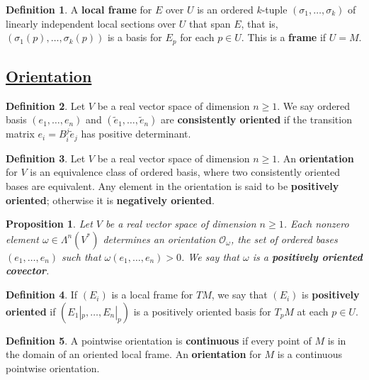 \documentclass[11pt]{amsart}
\newtheorem*{proposition*}{Proposition}
\theoremstyle{definition}
\newtheorem*{definition*}{Definition}
\renewcommand\geq{\geqslant}
\renewcommand\tilde{\widetilde}
\renewcommand\:{\colon}
\newcommand{\calO}{\mathcal{O}}
\newcommand{\1}{\mathds{1}}
\begin{document}
\begin{definition*}
	A \textbf{local frame} for $E$ over $U$ is an ordered $k$-tuple $(\sigma_1, \dots, \sigma_k)$ of linearly independent local sections over $U$ that span $E$, that is, $(\sigma_1(p), \dots, \sigma_k(p))$ is a basis for $E_p$ for each $p \in U$. This is a \textbf{frame} if $U = M$.
\end{definition*}

\vskip20pt



\subsection*{\underline{Orientation}}

\begin{definition*}
	Let $V$ be a real vector space of dimension $n \geq 1$. We say ordered basis $(e_1, \dots, e_n)$ and $(\tilde e_1, \dots, \tilde e_n)$ are \textbf{consistently oriented} if the transition matrix $e_i = B_i^j \tilde e_j$ has positive determinant.
\end{definition*}

\begin{definition*}
	Let $V$ be a real vector space of dimension $n \geq 1$. An \textbf{orientation} for $V$ is an equivalence class of ordered basis, where two consistently oriented bases are equivalent. Any element in the orientation is said to be \textbf{positively oriented}; otherwise it is \textbf{negatively oriented}.
\end{definition*}

\begin{proposition*}
	Let $V$ be a real vector space of dimension $n \geq 1$. Each nonzero element $\omega \in \Lambda^n(V^*)$ determines an orientation $\calO_\omega$, the set of ordered bases $(e_1, \dots, e_n)$ such that $\omega(e_1, \dots, e_n) > 0$. We say that $\omega$ is a \textbf{positively oriented covector}.
\end{proposition*}

\begin{definition*}
	If $(E_i)$ is a local frame for $TM$, we say that $(E_i)$ is \textbf{positively oriented} if $(E_1|_p, \dots, E_n|_p)$ is a positively oriented basis for $T_pM$ at each $p \in U$.
\end{definition*}

\begin{definition*}
	A pointwise orientation is \textbf{continuous} if every point of $M$ is in the domain of an oriented local frame. An \textbf{orientation} for $M$ is a continuous pointwise orientation.
\end{definition*}
\end{document}
